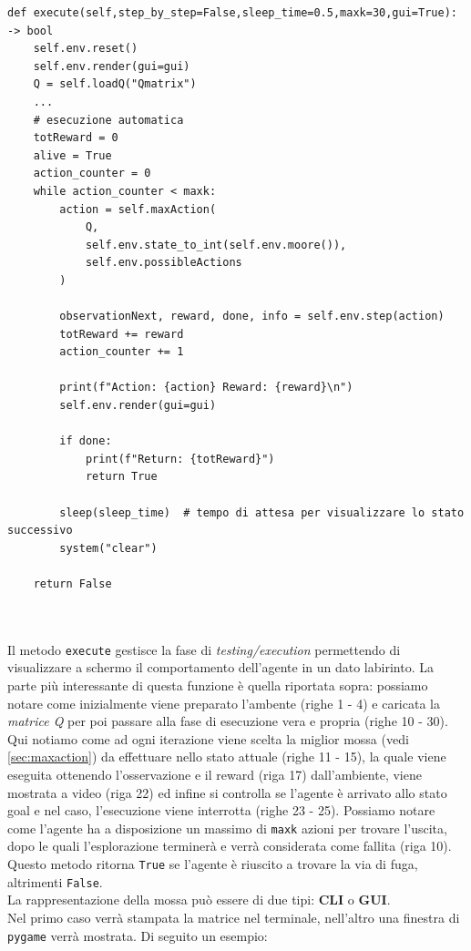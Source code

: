 \begin{lstlisting}[style=python, caption={Parte di codice del metodo execute}]
def execute(self,step_by_step=False,sleep_time=0.5,maxk=30,gui=True): -> bool
	self.env.reset()
	self.env.render(gui=gui)
	Q = self.loadQ("Qmatrix")
	...
	# esecuzione automatica
	totReward = 0
	alive = True
	action_counter = 0
	while action_counter < maxk:
		action = self.maxAction(
			Q,
			self.env.state_to_int(self.env.moore()),
			self.env.possibleActions
		)

		observationNext, reward, done, info = self.env.step(action)
		totReward += reward
		action_counter += 1
		
		print(f"Action: {action} Reward: {reward}\n")
		self.env.render(gui=gui)
		
		if done:
			print(f"Return: {totReward}")
			return True

		sleep(sleep_time)  # tempo di attesa per visualizzare lo stato successivo
		system("clear")

	return False
	
\end{lstlisting}
\ \\
Il metodo \lstinline[style=cmd]|execute| gestisce la fase di \textit{testing/execution} permettendo di visualizzare a schermo il comportamento dell'agente in un dato labirinto. La parte pi\`{u} interessante di questa funzione \`{e} quella riportata sopra: possiamo notare come inizialmente viene preparato l'ambente (righe 1 - 4) e caricata la \textit{matrice Q} per poi passare alla fase di esecuzione vera e propria (righe 10 - 30). Qui notiamo come ad ogni iterazione viene scelta la miglior mossa (vedi \autoref{sec:maxaction}) da effettuare nello stato attuale (righe 11 - 15), la quale viene eseguita ottenendo l'osservazione e il reward (riga 17) dall'ambiente, viene mostrata a video (riga 22) ed infine si controlla se l'agente \`{e} arrivato allo stato goal e nel caso, l'esecuzione viene interrotta (righe 23 - 25). Possiamo notare come l'agente ha a disposizione un massimo di \lstinline[style=cmd]|maxk| azioni per trovare l'uscita, dopo le quali l'esplorazione terminer\`{a} e verr\`{a} considerata come fallita (riga 10). Questo metodo ritorna \lstinline[style=cmd]|True| se l'agente \`{e} riuscito a trovare la via di fuga, altrimenti \lstinline[style=cmd]|False|.\\

La rappresentazione della mossa pu\`{o} essere di due tipi: \textbf{CLI} o \textbf{GUI}.\\
Nel primo caso verr\`{a} stampata la matrice nel terminale, nell'altro una finestra di \lstinline[style=cmd]|pygame| verr\`{a} mostrata. Di seguito un esempio:

